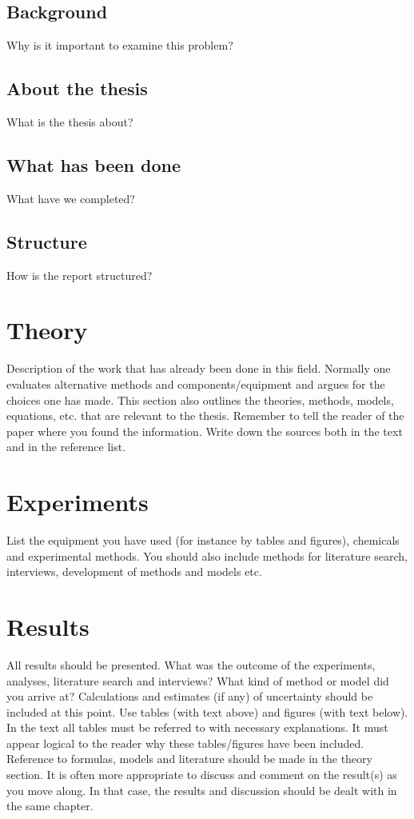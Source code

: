 \documentclass{article}
\begin{document}
	\subsection{Background}
	Why is it important to examine this problem?
	\subsection{About the thesis}
	What is the thesis about?
	\subsection{What has been done}
	What have we completed?
	\subsection{Structure}
	How is the report structured?	
\pagebreak

\section{Theory}
Description of the work that has already been done in this field. Normally one
evaluates alternative methods and components/equipment and argues for the choices one has
made. This section also outlines the theories, methods, models, equations, etc. that are
relevant to the thesis. Remember to tell the reader of the paper where you found the
information. Write down the sources both in the text and in the reference list. 
\pagebreak

\section{Experiments}
List the equipment you have used (for instance by tables and figures),
chemicals and experimental methods. You should also include methods for literature search,
interviews, development of methods and models etc. 
\pagebreak
 
\section{Results}
All results should be presented. What was the outcome of the experiments, analyses,
literature search and interviews? What kind of method or model did you arrive at?
Calculations and estimates (if any) of uncertainty should be included at this point. Use tables
(with text above) and figures (with text below). In the text all tables must be referred to with
necessary explanations. It must appear logical to the reader why these tables/figures have
been included. Reference to formulas, models and literature should be made in the theory
section. It is often more appropriate to discuss and comment on the result(s) as you move
along. In that case, the results and discussion should be dealt with in the same chapter. 
\pagebreak
\end{document}
